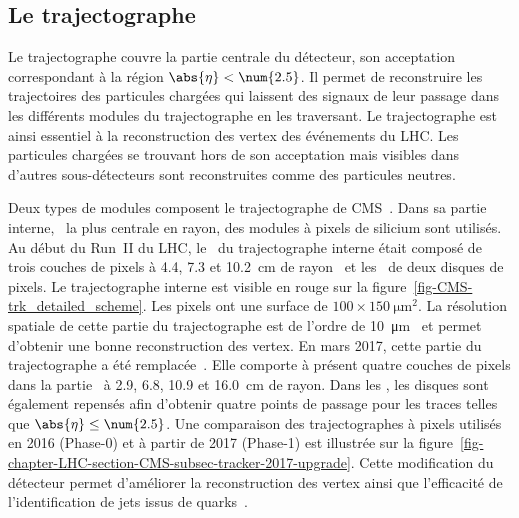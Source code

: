 \subsection{Le trajectographe}\label{chapter-LHC-section-CMS-subsec-tracker}
Le trajectographe couvre la partie centrale du détecteur, son acceptation correspondant à la région $\abs{\eta} < \num{2.5}$.
Il permet de reconstruire les trajectoires des particules chargées qui laissent des signaux de leur passage dans les différents modules du trajectographe en les traversant.
Le trajectographe est ainsi essentiel à la reconstruction des vertex des événements du LHC.
Les particules chargées se trouvant hors de son acceptation mais visibles dans d'autres sous-détecteurs sont reconstruites comme des particules neutres.
\par Deux types de modules composent le trajectographe de CMS~\cite{cms_paper,CERN-LHCC-98-006,CMS-TDR-11,CMS-TRK-11-001,CMS-TRK-17-001}.
Dans sa partie interne, \ie\ la plus centrale en rayon, des modules à pixels de silicium sont utilisés.
Au début du Run~II du LHC, le \CMSbarrel\ du trajectographe interne était composé de trois couches de pixels à \num{4.4}, \num{7.3} et \SI{10.2}{\centi\meter} de rayon~\cite{cms_paper} et les \CMSendcaps\ de deux disques de pixels.
Le trajectographe interne est visible en rouge sur la figure~\ref{fig-CMS-trk_detailed_scheme}.
Les pixels ont une surface de $\num{100}\times\SI{150}{\micro\meter^2}$.
La résolution spatiale de cette partie du trajectographe est de l'ordre de \SI{10}{\micro\meter}~\cite{cms_paper} et permet d'obtenir une bonne reconstruction des vertex.
En mars 2017, cette partie du trajectographe a été remplacée~\cite{CMS-TDR-11,cms_trk_upgrade_2017}.
Elle comporte à présent quatre couches de pixels dans la partie \CMSbarrel\ à \num{2.9}, \num{6.8}, \num{10.9} et \SI{16.0}{\centi\meter} de rayon.
Dans les \CMSendcaps, les disques sont également repensés afin d'obtenir quatre points de passage pour les traces telles que $\abs{\eta}\leq\num{2.5}$.
Une comparaison des trajectographes à pixels utilisés en 2016 (Phase-0) et à partir de 2017 (Phase-1) est illustrée sur la figure~\ref{fig-chapter-LHC-section-CMS-subsec-tracker-2017-upgrade}.
Cette modification du détecteur permet d'améliorer la reconstruction des vertex ainsi que l'efficacité de l'identification de jets issus de quarks~\quarkb.
